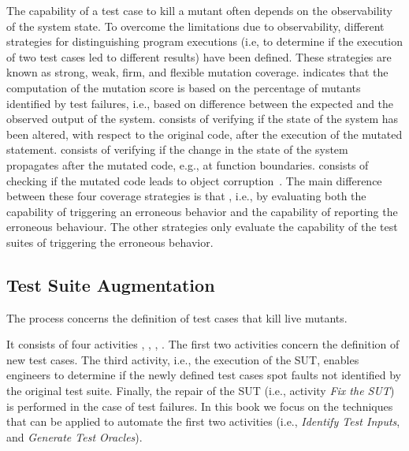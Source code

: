 The capability of a test case to kill a mutant often depends on the observability of the system state. 
To overcome the limitations due to observability, different strategies for distinguishing program executions (i.e, to determine if the execution of two test cases led to different results) have been defined. These strategies are known as strong, weak, firm, and flexible mutation coverage.
 indicates that the computation of the mutation score is based on the percentage of mutants identified by test failures, i.e., based on difference between the expected and the observed output of the system.  
 consists of verifying if the state of the system has been altered, with respect to the original code, after the execution of the mutated statement. 
 consists of verifying if the change in the state of the system propagates after the mutated code, e.g., at function boundaries. 
 consists of checking if the mutated code leads to object corruption~\cite{mateo2012validating}. The main difference between these four coverage strategies is that , i.e., by evaluating both the capability of triggering an erroneous behavior and the capability of reporting the erroneous behaviour. 
The other strategies only evaluate the capability of the test suites of triggering the erroneous behavior. 


\subsection{Test Suite Augmentation} %
\label{sub:test_suite_augmentation}

The  process concerns the definition of test cases that kill live mutants.


It consists of four activities , , , . The first two activities concern the definition of new test cases.
The third activity, i.e., the execution of the SUT, enables engineers to determine if the newly defined test cases spot faults not identified by the original test suite. 
Finally, the repair of the SUT (i.e., activity \emph{Fix the SUT}) is performed in the case of test failures.
In this book we focus on the techniques that can be applied to automate the first two activities (i.e., \emph{Identify Test Inputs}, and \emph{Generate Test Oracles}).
 
